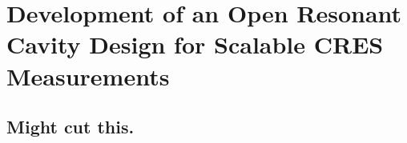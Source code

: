 
\chapter{Development of an Open Resonant Cavity Design for Scalable CRES Measurements}

\section{Might cut this.}

